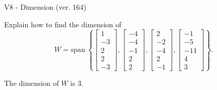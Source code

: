 \begin{exercise}
  \begin{exerciseTitle}V8 - Dimension (ver. 164)\end{exerciseTitle}
  \begin{exerciseStatement}
    Explain how to find the dimension of 
\[W=\mathrm{span}\ \left\{\left[\begin{array}{r}
1 \\
-3 \\
2 \\
2 \\
-3
\end{array}\right] , \left[\begin{array}{r}
-4 \\
-4 \\
-1 \\
2 \\
2
\end{array}\right] , \left[\begin{array}{r}
2 \\
-2 \\
-4 \\
2 \\
-1
\end{array}\right] , \left[\begin{array}{r}
-1 \\
-5 \\
-11 \\
4 \\
3
\end{array}\right]\right\}.\]



  \end{exerciseStatement}
  \begin{exerciseAnswer}
   The dimension of \(W\) is  \(3\).
  


  \end{exerciseAnswer}
\end{exercise}